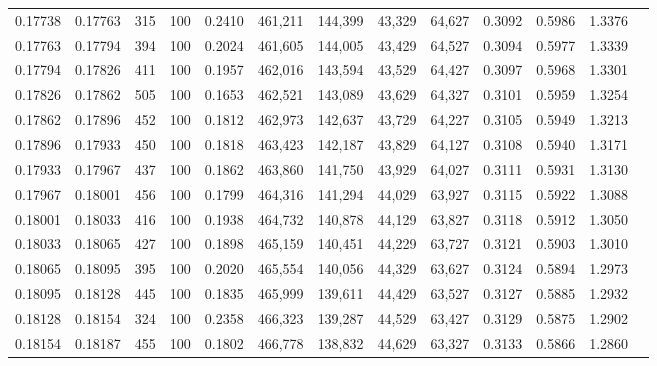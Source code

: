 \begin{tabular}{rrrrrrrrrrrrr}
0.17738 & 0.17763 &   315 & 100 &                                     0.2410 & 461,211 & 144,399 &  43,329 &  64,627 & 0.3092 & 0.5986 & 1.3376 \\
0.17763 & 0.17794 &   394 & 100 &                                     0.2024 & 461,605 & 144,005 &  43,429 &  64,527 & 0.3094 & 0.5977 & 1.3339 \\
0.17794 & 0.17826 &   411 & 100 &                                     0.1957 & 462,016 & 143,594 &  43,529 &  64,427 & 0.3097 & 0.5968 & 1.3301 \\
0.17826 & 0.17862 &   505 & 100 &                                     0.1653 & 462,521 & 143,089 &  43,629 &  64,327 & 0.3101 & 0.5959 & 1.3254 \\
0.17862 & 0.17896 &   452 & 100 &                                     0.1812 & 462,973 & 142,637 &  43,729 &  64,227 & 0.3105 & 0.5949 & 1.3213 \\
0.17896 & 0.17933 &   450 & 100 &                                     0.1818 & 463,423 & 142,187 &  43,829 &  64,127 & 0.3108 & 0.5940 & 1.3171 \\
0.17933 & 0.17967 &   437 & 100 &                                     0.1862 & 463,860 & 141,750 &  43,929 &  64,027 & 0.3111 & 0.5931 & 1.3130 \\
0.17967 & 0.18001 &   456 & 100 &                                     0.1799 & 464,316 & 141,294 &  44,029 &  63,927 & 0.3115 & 0.5922 & 1.3088 \\
0.18001 & 0.18033 &   416 & 100 &                                     0.1938 & 464,732 & 140,878 &  44,129 &  63,827 & 0.3118 & 0.5912 & 1.3050 \\
0.18033 & 0.18065 &   427 & 100 &                                     0.1898 & 465,159 & 140,451 &  44,229 &  63,727 & 0.3121 & 0.5903 & 1.3010 \\
0.18065 & 0.18095 &   395 & 100 &                                     0.2020 & 465,554 & 140,056 &  44,329 &  63,627 & 0.3124 & 0.5894 & 1.2973 \\
0.18095 & 0.18128 &   445 & 100 &                                     0.1835 & 465,999 & 139,611 &  44,429 &  63,527 & 0.3127 & 0.5885 & 1.2932 \\
0.18128 & 0.18154 &   324 & 100 &                                     0.2358 & 466,323 & 139,287 &  44,529 &  63,427 & 0.3129 & 0.5875 & 1.2902 \\
0.18154 & 0.18187 &   455 & 100 &                                     0.1802 & 466,778 & 138,832 &  44,629 &  63,327 & 0.3133 & 0.5866 & 1.2860 \\

\end{tabular}
